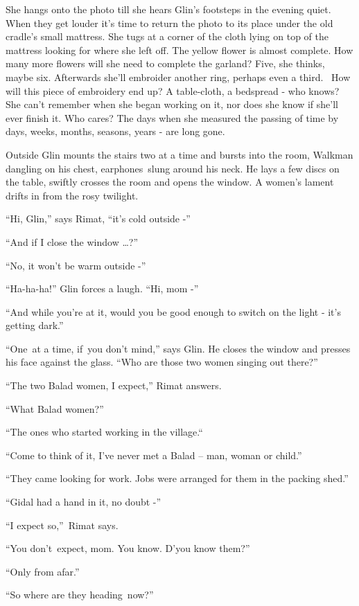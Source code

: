 \documentclass[twoside,11pt]{book}
\begin{document}
She hangs onto the photo till she hears Glin's footsteps in the
evening quiet. When they get louder it's time to return the photo to
its place under the old cradle's small mattress. She tugs at a
corner of the cloth lying on top of the
mattress looking for where she left off. The yellow flower is almost
complete. How many more flowers will she need to complete the
garland? Five, she thinks, maybe six. Afterwards she'll embroider
another ring, perhaps even a third.~
How will this piece of embroidery end
up? 
A table-cloth, a bedspread - who knows? She can't remember when she
began working on it, nor does she know if she'll ever finish it. Who
cares? The days when she measured the passing of time by days, weeks, months, seasons, years - are long gone.

Outside Glin mounts the stairs
two at a time and bursts into the room, Walkman dangling on his
chest, earphones~slung around his neck. He lays a few discs on the
table, swiftly crosses the room and opens the window.
A women's lament drifts in from the rosy twilight.

``Hi, Glin,''
says Rimat,  ``it's cold outside -''

``And if I close the window \dots?''

``No, it won't be warm outside -''

``Ha-ha-ha!'' Glin forces a
laugh. ``Hi, mom -'' 

``And while you're at it, would you be good enough to switch on the
light - it's getting dark.''

``One~at a time, if~you don't
mind,'' says Glin. He closes the window and presses his face against
the glass. ``Who are those
two women singing out
there?''

``The two Balad women, I
expect,'' Rimat answers.

``What Balad women?''

``The ones who started working in the
village.``

``Come to think of it, I've never met a Balad -- man,
woman or child.''

``They came looking for work. Jobs were arranged for them in the
packing shed.''

``Gidal had a hand in it, no doubt -''

``I expect
so,''~Rimat says. 

``You
don't~expect, mom. You know.
D'you know them?''

``Only from afar.''

``So where are they heading~now?''
\end{document}
